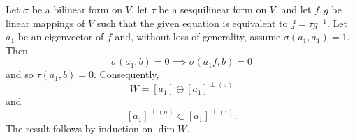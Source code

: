 Let $\sigma$ be a bilinear form on $V$, let $\tau$ be a sesquilinear form on $V$, and let $f, g$ be linear mappings of $V$ such that the given equation is equivalent to $f = \tau g^{-1}$. Let $a_1$ be an eigenvector of $f$ and, without loss of generality, assume $\sigma(a_1, a_1) = 1$. Then
$$\sigma(a_1, b) = 0 \implies \sigma(a_1 f, b) = 0$$
and so $\tau(a_1, b) = 0$. Consequently,
$$W = [a_1] \oplus [a_1]^{\perp(\sigma)}$$
and
$$[a_1]^{\perp(\sigma)} \subset [a_1]^{\perp(\tau)}.$$
The result follows by induction on $\dim W$.
